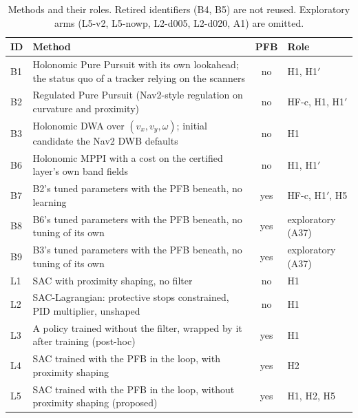 \documentclass[11pt]{article}
\newcommand{\Hprime}{H1$'$}
\theoremstyle{definition}
\begin{document}
\begin{table}[!htbp]
\centering
\caption{Methods and their roles. Retired identifiers (B4, B5) are not reused. Exploratory arms (L5-v2,
L5-nowp, L2-d005, L2-d020, A1) are omitted.}
\label{tab:methods}
\small
\begin{tabularx}{\textwidth}{lXcl}
\toprule
ID & Method & PFB & Role\\
\midrule
B1 & Holonomic Pure Pursuit with its own lookahead; the status quo of a tracker relying on the scanners & no & H1, \Hprime\\
B2 & Regulated Pure Pursuit (Nav2-style regulation on curvature and proximity) & no & HF-c, H1, \Hprime\\
B3 & Holonomic DWA over $(v_x,v_y,\omega)$; initial candidate the Nav2 DWB defaults & no & H1\\
B6 & Holonomic MPPI with a cost on the certified layer's own band fields & no & H1, \Hprime\\
B7 & B2's tuned parameters with the PFB beneath, no learning & yes & HF-c, \Hprime, H5\\
B8 & B6's tuned parameters with the PFB beneath, no tuning of its own & yes & exploratory (A37)\\
B9 & B3's tuned parameters with the PFB beneath, no tuning of its own & yes & exploratory (A37)\\
L1 & SAC with proximity shaping, no filter & no & H1\\
L2 & SAC-Lagrangian: protective stops constrained, PID multiplier, unshaped & no & H1\\
L3 & A policy trained without the filter, wrapped by it after training (post-hoc) & yes & H1\\
L4 & SAC trained with the PFB in the loop, with proximity shaping & yes & H2\\
L5 & SAC trained with the PFB in the loop, without proximity shaping (proposed) & yes & H1, H2, H5\\
\bottomrule
\end{tabularx}
\end{table}
\end{document}
